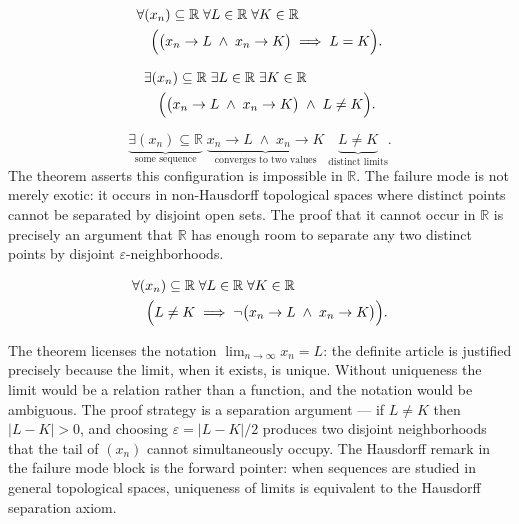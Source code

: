 \begin{remark*}
\[
\begin{aligned}
&\forall (x_n) \subseteq \mathbb{R} \;\forall L \in \mathbb{R}
\;\forall K \in \mathbb{R}\\
&\quad\Bigl(
    \bigl(x_n \to L \;\land\; x_n \to K\bigr)
    \;\Longrightarrow\;
    L = K
\Bigr).
\end{aligned}
\]
\end{remark*}

\begin{remark*}
\[
\begin{aligned}
&\exists (x_n) \subseteq \mathbb{R} \;\exists L \in \mathbb{R}
\;\exists K \in \mathbb{R}\\
&\quad\Bigl(
    \bigl(x_n \to L \;\land\; x_n \to K\bigr)
    \;\land\;
    L \neq K
\Bigr).
\end{aligned}
\]
\end{remark*}

\begin{remark*}
\[
\underbrace{\exists (x_n) \subseteq \mathbb{R}}_{\text{some sequence}}
\;\underbrace{x_n \to L \;\land\; x_n \to K}_{\text{converges to two values}}
\;\underbrace{L \neq K}_{\text{distinct limits}}.
\]
The theorem asserts this configuration is impossible in $\mathbb{R}$.
The failure mode is not merely exotic: it occurs in non-Hausdorff
topological spaces where distinct points cannot be separated by disjoint
open sets. The proof that it cannot occur in $\mathbb{R}$ is precisely
an argument that $\mathbb{R}$ has enough room to separate any two
distinct points by disjoint $\varepsilon$-neighborhoods.
\end{remark*}

\begin{remark*}
\[
\begin{aligned}
&\forall (x_n) \subseteq \mathbb{R} \;\forall L \in \mathbb{R}
\;\forall K \in \mathbb{R}\\
&\quad\Bigl(
    L \neq K
    \;\Longrightarrow\;
    \lnot\bigl(x_n \to L \;\land\; x_n \to K\bigr)
\Bigr).
\end{aligned}
\]
\end{remark*}

\begin{remark*}[Interpretation]
The theorem licenses the notation $\displaystyle\lim_{n \to \infty} x_n
= L$: the definite article is justified precisely because the limit,
when it exists, is unique. Without uniqueness the limit would be a
relation rather than a function, and the notation would be ambiguous.
The proof strategy is a separation argument — if $L \neq K$ then
$|L - K| > 0$, and choosing $\varepsilon = |L - K|/2$ produces two
disjoint neighborhoods that the tail of $(x_n)$ cannot simultaneously
occupy. The Hausdorff remark in the failure mode block is the forward
pointer: when sequences are studied in general topological spaces,
uniqueness of limits is equivalent to the Hausdorff separation axiom.
\end{remark*}





